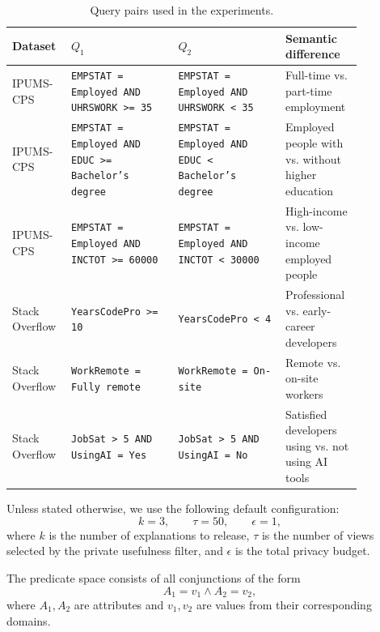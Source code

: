 \begin{table}[t]
\centering
\caption{Query pairs used in the experiments.}
\label{tab:query-pairs}
\begin{tabular}{p{0.12\linewidth} p{0.28\linewidth} p{0.28\linewidth} p{0.18\linewidth}}
\toprule
\textbf{Dataset} & \textbf{$Q_1$} & \textbf{$Q_2$} & \textbf{Semantic difference} \\
\midrule
IPUMS-CPS &
\texttt{EMPSTAT = Employed AND UHRSWORK >= 35} &
\texttt{EMPSTAT = Employed AND UHRSWORK < 35} &
Full-time vs. part-time employment \\

IPUMS-CPS &
\texttt{EMPSTAT = Employed AND EDUC >= Bachelor's degree} &
\texttt{EMPSTAT = Employed AND EDUC < Bachelor's degree} &
Employed people with vs. without higher education \\

IPUMS-CPS &
\texttt{EMPSTAT = Employed AND INCTOT >= 60000} &
\texttt{EMPSTAT = Employed AND INCTOT < 30000} &
High-income vs. low-income employed people \\

Stack Overflow &
\texttt{YearsCodePro >= 10} &
\texttt{YearsCodePro < 4} &
Professional vs. early-career developers \\

Stack Overflow &
\texttt{WorkRemote = Fully remote} &
\texttt{WorkRemote = On-site} &
Remote vs. on-site workers \\

Stack Overflow &
\texttt{JobSat > 5 AND UsingAI = Yes} &
\texttt{JobSat > 5 AND UsingAI = No} &
Satisfied developers using vs. not using AI tools \\
\bottomrule
\end{tabular}
\end{table}



Unless stated otherwise, we use the following default configuration:
\[
    k = 3, \qquad \tau = 50, \qquad \epsilon = 1,
\]
where $k$ is the number of explanations to release, $\tau$ is the number of views
selected by the private usefulness filter, and $\epsilon$ is the total privacy
budget.

The predicate space consists of all conjunctions of the form
\[
    A_1 = v_1 \wedge A_2 = v_2,
\]
where $A_1,A_2$ are attributes and $v_1,v_2$ are values from their corresponding
domains.

